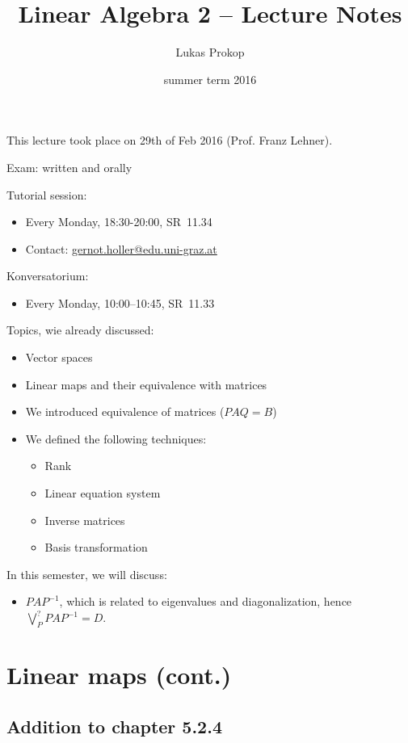 \documentclass[a4paper,landscape,twocolumn]{article}
\title{Linear Algebra 2 -- Lecture Notes}
\author{Lukas Prokop}
\date{summer term 2016}
\newcommand\meta[3]{This #1 took place on #2 (#3).\par}
\begin{document}
\maketitle
\tableofcontents
\meta{lecture}{29th of Feb 2016}{Prof. Franz Lehner}

Exam: written and orally

Tutorial session:
\begin{itemize}
  \item Every Monday, 18:30-20:00, SR~11.34
  \item Contact: \href{mailto:gernot.holler@edu.uni-graz.at}{gernot.holler@edu.uni-graz.at}
\end{itemize}
Konversatorium:
\begin{itemize}
  \item Every Monday, 10:00--10:45, SR~11.33
\end{itemize}

Topics, wie already discussed:
\begin{itemize}
  \item Vector spaces
  \item Linear maps and their equivalence with matrices
  \item We introduced equivalence of matrices ($PAQ = B$)
  \item We defined the following techniques:
    \begin{itemize}
      \item Rank
      \item Linear equation system
      \item Inverse matrices
      \item Basis transformation
    \end{itemize}
\end{itemize}

In this semester, we will discuss:
\begin{itemize}
  \item
    $PAP^{-1}$, which is related to eigenvalues and diagonalization,
    hence $\bigvee_{P}^? PAP^{-1} = D$.
\end{itemize}

\clearpage
\section{Linear maps (cont.)}

\subsection[Addition to chapter 5.2.4]{Addition to chapter 5.2.4}
\end{document}
